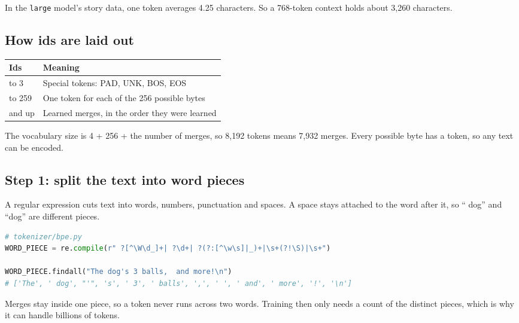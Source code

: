 \documentclass[11pt,a4paper]{article}
\newcommand{\code}[1]{\texttt{#1}}
\begin{document}
In the \code{large} model's story data, one token averages 4.25 characters. So a 768-token context holds about 3,260 characters.

\subsection*{How ids are laid out}
{}

{\small
\begin{longtable}{@{}>{\raggedright\arraybackslash}p{}>{\raggedright\arraybackslash}p{}@{}}
\toprule
\textbf{Ids} & \textbf{Meaning} \\
\midrule
\endhead
0 to 3 & Special tokens: PAD, UNK, BOS, EOS \\
4 to 259 & One token for each of the 256 possible bytes \\
260 and up & Learned merges, in the order they were learned \\
\bottomrule
\end{longtable}
}

The vocabulary size is 4 + 256 + the number of merges, so 8,192 tokens means 7,932 merges. Every possible byte has a token, so any text can be encoded.

\subsection*{Step 1: split the text into word pieces}
{}

A regular expression cuts text into words, numbers, punctuation and spaces. A space stays attached to the word after it, so “ dog” and “dog” are different pieces.

\begin{lstlisting}[language=Python]
# tokenizer/bpe.py
WORD_PIECE = re.compile(r" ?[^\W\d_]+| ?\d+| ?(?:[^\w\s]|_)+|\s+(?!\S)|\s+")

WORD_PIECE.findall("The dog's 3 balls,  and more!\n")
# ['The', ' dog', "'", 's', ' 3', ' balls', ',', ' ', ' and', ' more', '!', '\n']
\end{lstlisting}

Merges stay inside one piece, so a token never runs across two words. Training then only needs a count of the distinct pieces, which is why it can handle billions of tokens.
\end{document}
